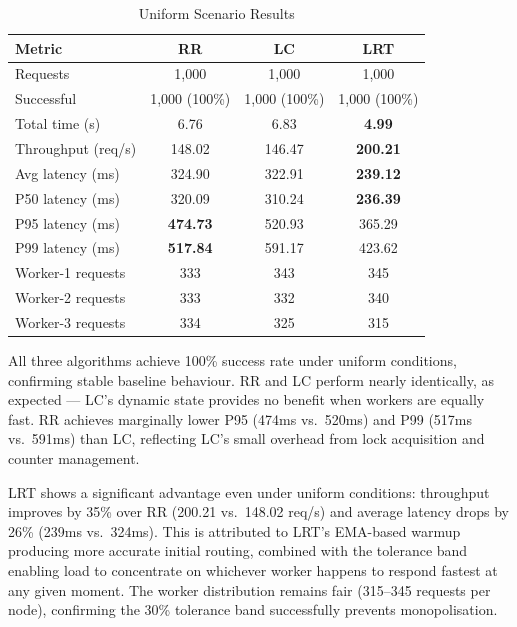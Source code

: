 \documentclass[conference]{IEEEtran}
\begin{document}
\begin{table}[h]
  \centering
  \caption{Uniform Scenario Results}
  \begin{tabular}{lccc}
    \toprule
    \textbf{Metric} & \textbf{RR} & \textbf{LC} & \textbf{LRT} \\
    \midrule
    Requests           & 1,000     & 1,000     & 1,000      \\
    Successful         & 1,000 (100\%) & 1,000 (100\%) & 1,000 (100\%) \\
    Total time (s)     & 6.76      & 6.83      & \textbf{4.99} \\
    Throughput (req/s) & 148.02    & 146.47    & \textbf{200.21} \\
    Avg latency (ms)   & 324.90    & 322.91    & \textbf{239.12} \\
    P50 latency (ms)   & 320.09    & 310.24    & \textbf{236.39} \\
    P95 latency (ms)   & \textbf{474.73} & 520.93 & 365.29 \\
    P99 latency (ms)   & \textbf{517.84} & 591.17 & 423.62 \\
    Worker-1 requests  & 333       & 343       & 345        \\
    Worker-2 requests  & 333       & 332       & 340        \\
    Worker-3 requests  & 334       & 325       & 315        \\
    \bottomrule
  \end{tabular}
\end{table}

All three algorithms achieve 100\% success rate under uniform conditions, confirming stable baseline behaviour. RR and LC perform nearly identically, as expected --- LC's dynamic state provides no benefit when workers are equally fast. RR achieves marginally lower P95 (474ms vs.\ 520ms) and P99 (517ms vs.\ 591ms) than LC, reflecting LC's small overhead from lock acquisition and counter management.

LRT shows a significant advantage even under uniform conditions: throughput improves by 35\% over RR (200.21 vs.\ 148.02 req/s) and average latency drops by 26\% (239ms vs.\ 324ms). This is attributed to LRT's EMA-based warmup producing more accurate initial routing, combined with the tolerance band enabling load to concentrate on whichever worker happens to respond fastest at any given moment. The worker distribution remains fair (315--345 requests per node), confirming the 30\% tolerance band successfully prevents monopolisation.
\end{document}
